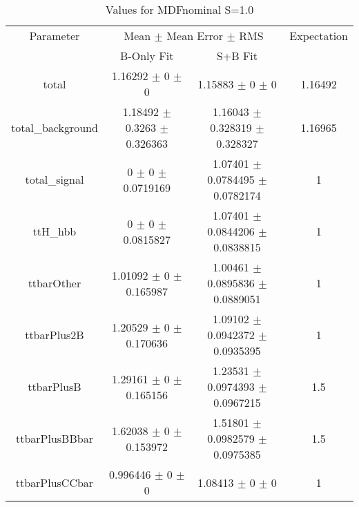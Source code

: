 \begin{table}
\centering
\caption{Values for MDFnominal S=1.0}
\begin{tabular}{cccc}
\toprule
Parameter & \multicolumn{2}{c}{Mean $\pm$ Mean Error $\pm$ RMS} & Expectation\\
 & B-Only Fit & S+B Fit & \\
\midrule
total & \num{1.16292} $\pm$ \num{0} $\pm$ \num{0} & \num{1.15883} $\pm$ \num{0} $\pm$ \num{0} & \num{1.16492}\\
total\_background & \num{1.18492} $\pm$ \num{0.3263} $\pm$ \num{0.326363} & \num{1.16043} $\pm$ \num{0.328319} $\pm$ \num{0.328327} & \num{1.16965}\\
total\_signal & \num{0} $\pm$ \num{0} $\pm$ \num{0.0719169} & \num{1.07401} $\pm$ \num{0.0784495} $\pm$ \num{0.0782174} & \num{1}\\
ttH\_hbb & \num{0} $\pm$ \num{0} $\pm$ \num{0.0815827} & \num{1.07401} $\pm$ \num{0.0844206} $\pm$ \num{0.0838815} & \num{1}\\
ttbarOther & \num{1.01092} $\pm$ \num{0} $\pm$ \num{0.165987} & \num{1.00461} $\pm$ \num{0.0895836} $\pm$ \num{0.0889051} & \num{1}\\
ttbarPlus2B & \num{1.20529} $\pm$ \num{0} $\pm$ \num{0.170636} & \num{1.09102} $\pm$ \num{0.0942372} $\pm$ \num{0.0935395} & \num{1}\\
ttbarPlusB & \num{1.29161} $\pm$ \num{0} $\pm$ \num{0.165156} & \num{1.23531} $\pm$ \num{0.0974393} $\pm$ \num{0.0967215} & \num{1.5}\\
ttbarPlusBBbar & \num{1.62038} $\pm$ \num{0} $\pm$ \num{0.153972} & \num{1.51801} $\pm$ \num{0.0982579} $\pm$ \num{0.0975385} & \num{1.5}\\
ttbarPlusCCbar & \num{0.996446} $\pm$ \num{0} $\pm$ \num{0} & \num{1.08413} $\pm$ \num{0} $\pm$ \num{0} & \num{1}\\
\bottomrule
\end{tabular}
\end{table}